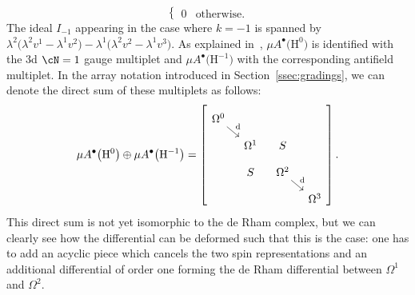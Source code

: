 \documentclass[10pt,a4paper]{amsart}
\numberwithin{equation}{section}
\def\bu{\bullet}
\def\d{{\rm d}}
\begin{document}
\begin{eg}
\begin{equation*}
\begin{cases}
	0 & \text{otherwise.}
	\end{cases}
	\end{equation*}
	The ideal $I_{-1}$ appearing in the case where $k=-1$ is spanned by $\lambda^2 \big(\lambda^2 v^1 - \lambda^1 v^2\big) - \lambda^1\big(\lambda^2 v^2 - \lambda^1 v^3\big)$. As explained in~\cite{perspectives}, $\mu A^\bullet\big(\mathrm H^0\big)$ is identified with the 3d $\cN=1$ gauge multiplet and $\mu A^\bullet\big(\mathrm H^{-1}\big)$ with the corresponding antifield multiplet. In the array notation introduced in Section~\ref{ssec:gradings}, we can denote the direct sum of these multiplets as follows:
	\begin{equation*}
	\mu A^\bu\big(\mathrm H^0\big) \oplus \mu A^\bu\big(\mathrm H^{-1}\big) = \left[
	\begin{tikzcd}[column sep = 0.3cm , row sep = 0.3cm]
	\Omega^0 \arrow[dr ,"\d"] & & \\
	& \Omega^1 & S \\
	& S & \Omega^2 \arrow[dr , "\d"] \\
	& & & \Omega^3
	\end{tikzcd} \right].
	\end{equation*}
	This direct sum is not yet isomorphic to the de Rham complex, but we can clearly see how the differential can be deformed such that this is the case: one has to add an acyclic piece which cancels the two spin representations and an additional differential of order one forming the de Rham differential between $\Omega^1$ and $\Omega^2$.
	

\end{eg}
\end{document}
